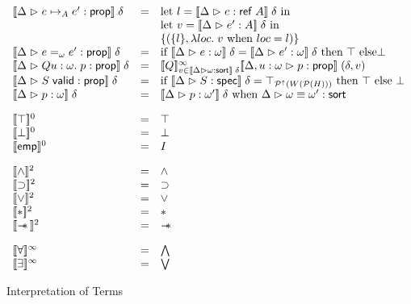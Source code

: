 \begin{figure}
\begin{displaymath}
\begin{array}{lcl}
\interp{\judgeA{e \pointsto_A e'}{\assert}}\;\delta & = & 
    \mbox{let } l = \interp{\judgeA{e}{\reftype{A}}}\;\delta \mbox{ in}\\
& & \mbox{let } v = \interp{\judgeA{e'}{A}}\;\delta \mbox{ in} \\

& & \setof{(\setof{l}, \semfun{loc}{v \mbox{ when } loc = l})} \\


\interp{\judgeA{e =_\omega e'}{\assert}}\;\delta & = & 
   \mbox{if }\interp{\judgeA{e}{\omega}}\;\delta = \interp{\judgeA{e'}{\omega}}\;\delta 
   \mbox{ then } \top \mbox{ else} \bot \\

\interp{\judgeA{Q u:\omega.\; p}{\assert}}\;\delta & = & 
  \interp{Q}^\infty_{v \in \interp{\judgeSort{\omega}}\;\delta}
    \interp{\judgeA[\Delta, u:\omega]{p}{\assert}}\;(\delta, v) \\

\interp{\judgeA{\validprop{S}}{\assert}}\;\delta & = & 
   \mbox{if } \interp{\judgeS{S}}\;\delta = \top_{\upset{W(\powerset{H})}}
   \mbox{ then } \top
   \mbox{ else } \bot \\

\interp{\judgeA{p}{\omega}}\;\delta & = & 
   \interp{\judgeA{p}{\omega'}}\;\delta \mbox{ when } \judgeSortEq{\omega}{\omega'} \\[1em]


\interp{\top}^0 & = & \top \\
\interp{\bot}^0 & = & \bot \\
\interp{\emp}^0 & = & I \\[1em]

\interp{\land}^2    & = & \land \\
\interp{\implies}^2 & = & \implies \\
\interp{\vee}^2     & = & \vee \\
\interp{*}^2        & = & * \\
\interp{\wand}^2    & = & \wand \\[1em]

\interp{\forall}^\infty & = & \bigwedge \\
\interp{\exists}^\infty & = & \bigvee \\
\end{array}
\end{displaymath}
\caption{ Interpretation of Terms }
\label{term-interpretation}  
\end{figure}

